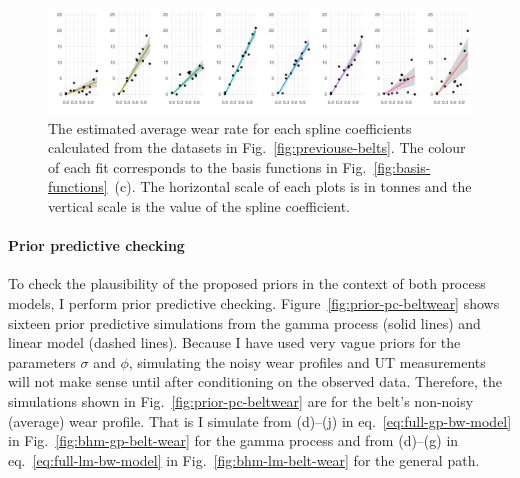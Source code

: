\begin{figure}
  \centering
  \includegraphics[width=\textwidth]{figures/ch-6/informative-prior-mu.pdf}
  \caption{The estimated average wear rate for each spline coefficients calculated from the datasets in Fig.~\ref{fig:previouse-belts}. The colour of each fit corresponds to the basis functions in Fig.~\ref{fig:basis-functions}~(c). The horizontal scale of each plots is in tonnes and the vertical scale is the value of the spline coefficient.}
  \label{fig:inf-prior-mu}
\end{figure}

\paragraph*{Prior predictive checking} 

To check the plausibility of the proposed priors in the context of both process models, I perform prior predictive checking. Figure~\ref{fig:prior-pc-beltwear} shows sixteen prior predictive simulations from the gamma process (solid lines) and linear model (dashed lines). Because I have used very vague priors for the parameters $\sigma$ and $\phi$, simulating the noisy wear profiles and UT measurements will not make sense until after conditioning on the observed data. Therefore, the simulations shown in Fig.~\ref{fig:prior-pc-beltwear} are for the belt's non-noisy (average) wear profile. That is I simulate from (d)--(j) in eq.~\eqref{eq:full-gp-bw-model} in Fig.~\ref{fig:bhm-gp-belt-wear} for the gamma process and from (d)--(g) in eq.~\eqref{eq:full-lm-bw-model} in Fig.~\ref{fig:bhm-lm-belt-wear} for the general path.

